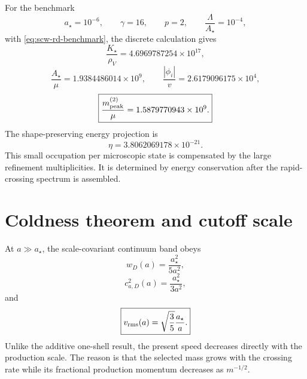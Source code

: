 For the benchmark
\begin{equation}
 a_\star=10^{-6},
 \qquad
 \gamma=16,
 \qquad
 p=2,
 \qquad
 \frac{\Lambda}{A_\star}=10^{-4},
 \label{eq:scw-benchmark-inputs}
\end{equation}
with \eqref{eq:scw-rd-benchmark}, the discrete calculation gives
\begin{equation}
 \frac{K_\star}{\rho_V}
 =4.6969787254\times10^{17},
 \label{eq:scw-benchmark-F}
\end{equation}
\begin{equation}
 \frac{A_\star}{\mu}
 =1.9384486014\times10^9,
 \qquad
 \frac{|\phi_i|}{v}=2.6179096175\times10^4,
 \label{eq:scw-benchmark-hierarchy}
\end{equation}
\begin{equation}
 \boxed{
 \frac{m_{\rm peak}^{(2)}}\mu
 =1.5879770943\times10^9.}
 \label{eq:scw-benchmark-peak}
\end{equation}
The shape-preserving energy projection is
\begin{equation}
 \eta=3.8062069178\times10^{-21}.
 \label{eq:scw-benchmark-eta}
\end{equation}
This small occupation per microscopic state is compensated by the large refinement multiplicities.  It is determined by energy conservation after the rapid-crossing spectrum is assembled.

\section{Coldness theorem and cutoff scale}

At $a\gg a_\star$, the scale-covariant continuum band obeys
\begin{equation}
 \boxed{
 w_D(a)=\frac{a_\star^2}{5a^2},}
 \label{eq:scw-late-w}
\end{equation}
\begin{equation}
 \boxed{
 c_{a,D}^2(a)=\frac{a_\star^2}{3a^2},}
 \label{eq:scw-late-ca}
\end{equation}
and
\begin{equation}
 \boxed{
 v_{\rm rms}(a)
 =\sqrt{\frac35}\frac{a_\star}{a}.}
 \label{eq:scw-late-speed}
\end{equation}
Unlike the additive one-shell result, the present speed decreases directly with the production scale.  The reason is that the selected mass grows with the crossing rate while its fractional production momentum decreases as $m^{-1/2}$.

